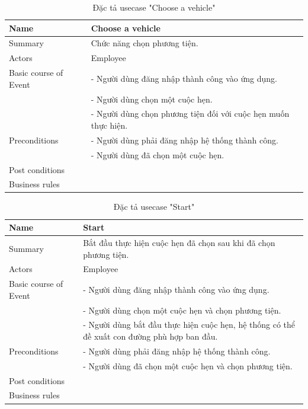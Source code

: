 \documentclass[a4paper]{article}
\begin{document}
\begin{table}[!h]
    \centering
    \begin{tabular}{|m{3.2cm}|m{10.5cm}|}
        \hline
        Name & Choose a vehicle\\
        \hline
        Summary & Chức năng chọn phương tiện.\\
        \hline
        Actors & Employee\\
        \hline
        Basic course of Event & -	Người dùng đăng nhập thành công vào ứng dụng.\\
&-	Người dùng chọn một cuộc hẹn.\\
&-	Người dùng chọn phương tiện đối với cuộc hẹn muốn thực hiện.\\
        \hline
        Preconditions & -	Người dùng  phải đăng nhập hệ thống thành công.\\
&-	Người dùng đã chọn một cuộc hẹn.\\
        \hline
        Post conditions & \\
        \hline
        Business rules & \\
        \hline
    \end{tabular}
    \caption{Đặc tả usecase "Choose a vehicle"}
\end{table}
\begin{table}[!h]
    \centering
    \begin{tabular}{|m{3.2cm}|m{10.5cm}|}
        \hline
        Name & Start \\
        \hline
        Summary & Bắt đầu thực hiện cuộc hẹn đã chọn sau khi đã chọn phương tiện.\\
        \hline
        Actors & Employee\\
        \hline
        Basic course of Event & -	Người dùng đăng nhập thành công vào ứng dụng.\\
&-	Người dùng chọn một cuộc hẹn và chọn phương tiện.\\
&-	Người dùng bắt đầu thực hiện cuộc hẹn, hệ thống có thể đề xuất con đường phù hợp ban đầu.\\
        \hline
        Preconditions & -	Người dùng  phải đăng nhập hệ thống thành công.\\
&-	Người dùng đã chọn một cuộc hẹn và chọn phương tiện.\\
        \hline
        Post conditions & \\
        \hline
        Business rules & \\
        \hline
    \end{tabular}
    \caption{Đặc tả usecase "Start"}
\end{table}
\end{document}
